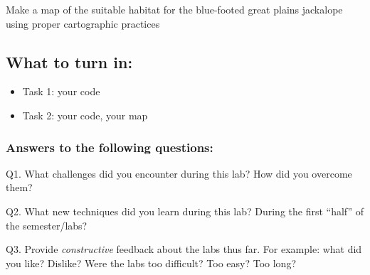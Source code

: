 \documentclass[]{article}
\begin{document}
Make a map of the suitable habitat for the blue-footed great plains
jackalope using proper cartographic practices

\newpage

\hypertarget{what-to-turn-in}{%
\subsection{What to turn in:}\label{what-to-turn-in}}

\begin{itemize}
\item
  Task 1: your code
\item
  Task 2: your code, your map
\end{itemize}

\hypertarget{answers-to-the-following-questions}{%
\subsubsection{Answers to the following
questions:}\label{answers-to-the-following-questions}}

Q1. What challenges did you encounter during this lab? How did you
overcome them?

Q2. What new techniques did you learn during this lab? During the first
``half'' of the semester/labs?

Q3. Provide \emph{constructive} feedback about the labs thus far. For
example: what did you like? Dislike? Were the labs too difficult? Too
easy? Too long?
\end{document}

